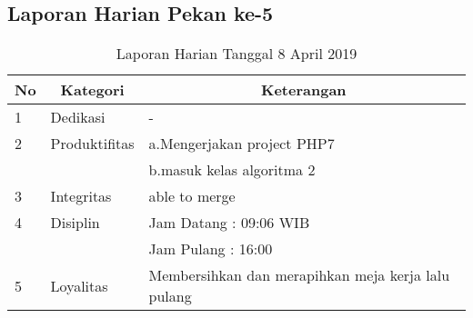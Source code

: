 \subsection{Laporan Harian Pekan ke-5}

\begin{table}[htp]
\caption{Laporan Harian Tanggal 8 April 2019}
\label{tab:lh080419}
\begin{tabular}{|l|l|l|}
\hline
\textbf{No} & \multicolumn{1}{c|}{\textbf{Kategori}} & \multicolumn{1}{c|}{\textbf{Keterangan}} \\ \hline
1 & Dedikasi & - \\ \hline
2 & Produktifitas & a.Mengerjakan project PHP7 \\
   & & b.masuk kelas algoritma 2 \\ \hline
3 & Integritas & able to merge \\ \hline
4 & Disiplin & Jam Datang : 09:06 WIB \\
   &  & Jam Pulang : 16:00 \\ \hline
5 & Loyalitas & Membersihkan dan merapihkan meja kerja lalu pulang \\ \hline
\end{tabular}
\end{table}

